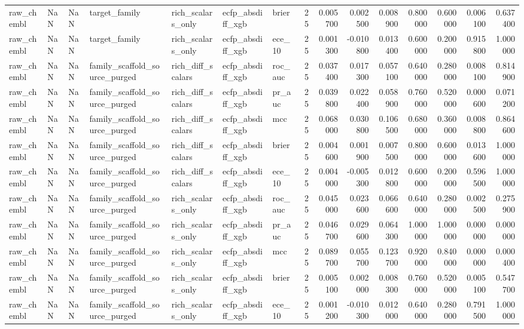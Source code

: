 \begin{longtable}{lllllllrrrrrrrr}
raw\_chembl & NaN & NaN & target\_family & rich\_scalars\_only & ecfp\_absdiff\_xgb & brier & 25 & 0.005700 & 0.002500 & 0.008900 & 0.800000 & 0.600000 & 0.006100 & 0.637400 \\
raw\_chembl & NaN & NaN & target\_family & rich\_scalars\_only & ecfp\_absdiff\_xgb & ece\_10 & 25 & 0.001300 & -0.010800 & 0.013400 & 0.600000 & 0.200000 & 0.915800 & 1.000000 \\
raw\_chembl & NaN & NaN & family\_scaffold\_source\_purged & rich\_diff\_scalars & ecfp\_absdiff\_xgb & roc\_auc & 25 & 0.037400 & 0.017300 & 0.057100 & 0.640000 & 0.280000 & 0.008100 & 0.814900 \\
raw\_chembl & NaN & NaN & family\_scaffold\_source\_purged & rich\_diff\_scalars & ecfp\_absdiff\_xgb & pr\_auc & 25 & 0.039800 & 0.022400 & 0.058900 & 0.760000 & 0.520000 & 0.000600 & 0.071200 \\
raw\_chembl & NaN & NaN & family\_scaffold\_source\_purged & rich\_diff\_scalars & ecfp\_absdiff\_xgb & mcc & 25 & 0.068000 & 0.030800 & 0.106500 & 0.680000 & 0.360000 & 0.008800 & 0.864600 \\
raw\_chembl & NaN & NaN & family\_scaffold\_source\_purged & rich\_diff\_scalars & ecfp\_absdiff\_xgb & brier & 25 & 0.004600 & 0.001900 & 0.007500 & 0.800000 & 0.600000 & 0.013600 & 1.000000 \\
raw\_chembl & NaN & NaN & family\_scaffold\_source\_purged & rich\_diff\_scalars & ecfp\_absdiff\_xgb & ece\_10 & 25 & 0.004000 & -0.005300 & 0.012800 & 0.600000 & 0.200000 & 0.596500 & 1.000000 \\
raw\_chembl & NaN & NaN & family\_scaffold\_source\_purged & rich\_scalars\_only & ecfp\_absdiff\_xgb & roc\_auc & 25 & 0.045000 & 0.023600 & 0.066600 & 0.640000 & 0.280000 & 0.002500 & 0.275900 \\
raw\_chembl & NaN & NaN & family\_scaffold\_source\_purged & rich\_scalars\_only & ecfp\_absdiff\_xgb & pr\_auc & 25 & 0.046700 & 0.029600 & 0.064300 & 1.000000 & 1.000000 & 0.000000 & 0.000000 \\
raw\_chembl & NaN & NaN & family\_scaffold\_source\_purged & rich\_scalars\_only & ecfp\_absdiff\_xgb & mcc & 25 & 0.089700 & 0.055700 & 0.123700 & 0.920000 & 0.840000 & 0.000000 & 0.000400 \\
raw\_chembl & NaN & NaN & family\_scaffold\_source\_purged & rich\_scalars\_only & ecfp\_absdiff\_xgb & brier & 25 & 0.005100 & 0.002000 & 0.008300 & 0.760000 & 0.520000 & 0.005100 & 0.547700 \\
raw\_chembl & NaN & NaN & family\_scaffold\_source\_purged & rich\_scalars\_only & ecfp\_absdiff\_xgb & ece\_10 & 25 & 0.001200 & -0.010300 & 0.012000 & 0.640000 & 0.280000 & 0.791500 & 1.000000 \\

\end{longtable}
